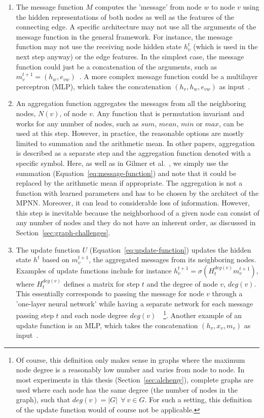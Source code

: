 \begin{enumerate}
	\item The message function $M$ computes the 'message' from node $w$ to node $v$ using the hidden representations of both nodes as well as the features of the connecting edge. A specific architecture may not use all the arguments of the message function in the general framework. For instance, the message function may not use the receiving node hidden state $h_v^t$ (which is used in the next step anyway) or the edge features. In the simplest case, the message function could just be a concatenation of the arguments, such as $m_v^{t+1} = (h_w, e_{vw})$~\cite{Duvenaud2015}. A more complex message function could be a multilayer perceptron (MLP), which takes the concatenation $(h_v, h_w, e_{vw})$ as input~\cite{Battaglia2016}.
	
	\item An aggregation function aggregates the messages from all the neighboring nodes, $N(v)$, of node $v$. Any function that is permutation invariant and works for any number of nodes, such as $sum$, $mean$, $min$ or $max$, can be used at this step. However, in practice, the reasonable options are mostly limited to summation and the arithmetic mean.	
	In other papers, aggregation is described as a separate step and the aggregation function denoted with a specific symbol. Here, as well as in Gilmer et al.~\cite{Gilmer2017}, we simply use the summation (Equation~\ref{eq:message-function}) and note that it could be replaced by the arithmetic mean if appropriate.
	The aggregation is not a function with learned parameters and has to be chosen by the architect of the MPNN. Moreover, it can lead to considerable loss of information. However, this step is inevitable because the neighborhood of a given node can consist of any number of nodes and they do not have an inherent order, as discussed in Section~\ref{sec:graph-challenges}.
	
	\item The update function $U$ (Equation~\ref{eq:update-function}) updates the hidden state $h^t$ based on  $m_v^{t+1}$, the aggregated messages from its neighboring nodes. Examples of update functions include for instance $h_v^{t+1} = \sigma(H_t^{deg(v)} m_v^{t+1})$, where $H_t^{deg(v)}$ defines a matrix for step $t$ and the degree of node $v$, $deg(v)$. This essentially corresponds to passing the message for node $v$ through a 'one-layer neural network' while having a separate network for each message passing step $t$ and each node degree $deg(v)$~\cite{Duvenaud2015}~\footnote{
		Of course, this definition only makes sense in graphs where the maximum node degree is a reasonably low number  and varies from node to node. In most experiments in this thesis (Section~\ref{sec:alchemy}), complete graphs are used where each node has the same degree (the number of nodes in the graph), such that $deg(v) =|G|~~ \forall~ v \in G$. For such a setting, this definition of the update function would of course not be applicable.
	}. Another example of an update function is an MLP, which takes the concatenation $(h_v, x_v, m_v)$ as input~\cite{Battaglia2016}.
\end{enumerate}

